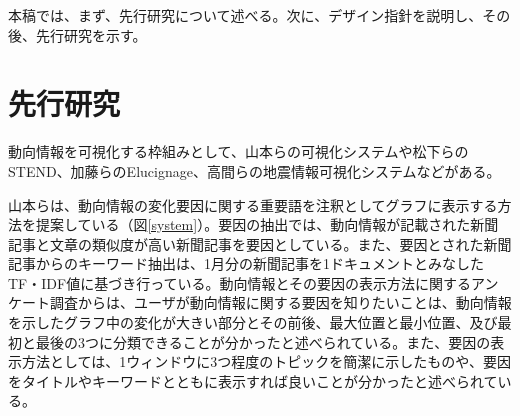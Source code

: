 \documentclass{matsushita-zemi}
\begin{document}
本稿では、まず、先行研究について述べる。次に、デザイン指針を説明し、その後、先行研究を示す。

\section{先行研究}
\label{relatedworks} 
動向情報を可視化する枠組みとして、山本らの可視化システム\cite{Tagged_corpus}や松下らのSTEND\cite{STEND}、加藤らのElucignage\cite{InformationcompiledStudyGroup}、高間らの地震情報可視化システム\cite{SpaceTrendInformation}などがある。

山本らは、動向情報の変化要因に関する重要語を注釈としてグラフに表示する方法を提案している（図\ref{system}）\cite{タグ付きコーパス}。要因の抽出では、動向情報が記載された新聞記事と文章の類似度が高い新聞記事を要因としている。また、要因とされた新聞記事からのキーワード抽出は、1月分の新聞記事を1ドキュメントとみなしたTF・IDF値に基づき行っている。動向情報とその要因の表示方法に関するアンケート調査からは、ユーザが動向情報に関する要因を知りたいことは、動向情報を示したグラフ中の変化が大きい部分とその前後、最大位置と最小位置、及び最初と最後の3つに分類できることが分かったと述べられている。また、要因の表示方法としては、1ウィンドウに3つ程度のトピックを簡潔に示したものや、要因をタイトルやキーワードとともに表示すれば良いことが分かったと述べられている。

\end{document}
